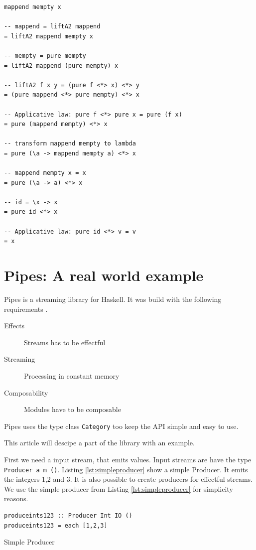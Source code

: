 \documentclass[twoside, a4paper]{article}
\begin{document}
\begin{verbatim}
mappend mempty x

-- mappend = liftA2 mappend  
= liftA2 mappend mempty x

-- mempty = pure mempty   
= liftA2 mappend (pure mempty) x

-- liftA2 f x y = (pure f <*> x) <*> y
= (pure mappend <*> pure mempty) <*> x

-- Applicative law: pure f <*> pure x = pure (f x)
= pure (mappend mempty) <*> x

-- transform mappend mempty to lambda
= pure (\a -> mappend mempty a) <*> x

-- mappend mempty x = x
= pure (\a -> a) <*> x

-- id = \x -> x
= pure id <*> x

-- Applicative law: pure id <*> v = v
= x
\end{verbatim}

\section{Pipes: A real world example}
\label{sec:pipes}

Pipes is a streaming library for Haskell. It was build with the following requirements \cite{gonzales13}.
\begin{description}
\item[Effects] Streams has to be effectful
\item[Streaming] Processing in constant memory
\item[Composability] Modules have to be composable
\end{description}

Pipes uses the type class \verb|Category| too keep the API simple and easy to use.

This article will descipe a part of the library with an example.

First we need a input stream, that emits values. Input streams are have the type 
\verb|Producer a m ()|.
Listing \ref{lst:simpleproducer} show a simple Producer. It emits the integers 1,2 and 3. It is also possible to create producers for effectful streams. We use the simple producer from Listing \ref{lst:simpleproducer} for simplicity reasons.

\begin{program}
\begin{verbatim}
produceints123 :: Producer Int IO ()
produceints123 = each [1,2,3]
\end{verbatim}
\caption{Simple Producer}
\label{lst:simpleproducer}
\end{program}
\end{document}
